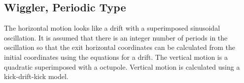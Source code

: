 \documentclass{book}
\begin{document}
\subsection{Wiggler, Periodic Type}

The horizontal motion looks like a drift with a superimposed
sinusoidal oscillation. It is assumed that there is an integer number
of periods in the oscillation so that the exit horizontal coordinates
can be calculated from the initial coordinates using the equations for
a drift. The vertical motion is a quadratic superimposed with a
octupole. Vertical motion is calculated using a kick-drift-kick model.
\end{document}
